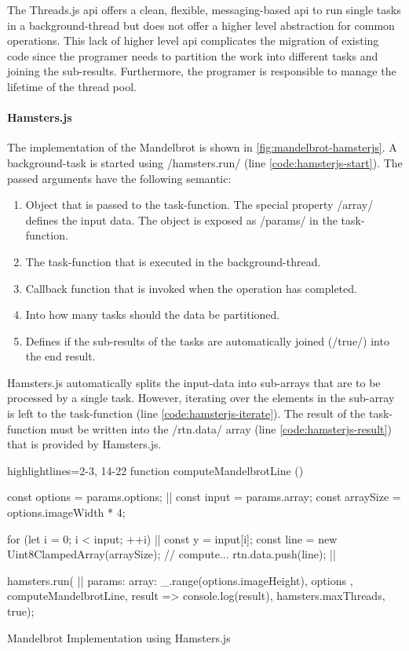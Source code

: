 The Threads.js api offers a clean, flexible, messaging-based api to run single tasks in a background-thread but does not offer a higher level abstraction for common operations. This lack of higher level api complicates the migration of existing code since the programer needs to partition the work into different tasks and joining the sub-results. Furthermore, the programer is responsible to manage the lifetime of the thread pool. 

\paragraph{Hamsters.js}
The implementation of the Mandelbrot is shown in \cref{fig:mandelbrot-hamsterjs}. A background-task is started using \javascriptinline/hamsters.run/ (line \ref{code:hamsterjs-start}). The passed arguments have the following semantic:

\begin{enumerate}
	\item Object that is passed to the task-function. The special property \javascriptinline/array/ defines the input data. The object is exposed as \javascriptinline/params/ in the task-function.
	\item The task-function that is executed in the background-thread.
	\item Callback function that is invoked when the operation has completed.
	\item Into how many tasks should the data be partitioned. 
	\item Defines if the sub-results of the tasks are automatically joined (\javascriptinline/true/) into the end result.
\end{enumerate}

Hamsters.js automatically splits the input-data into sub-arrays that are to be processed by a single task. However, iterating over the elements in the sub-array is left to the task-function (line \ref{code:hamsterjs-iterate}). The result of the task-function must be written into the \javascriptinline/rtn.data/ array (line \ref{code:hamsterjs-result}) that is provided by Hamsters.js. 

\begin{listing}
\begin{javascriptcode*}{highlightlines={2-3, 14-22}}
function computeMandelbrotLine () {
	const options = params.options; |$\label{code:hamstersjs-params}$|
	const input = params.array;
	const arraySize = options.imageWidth * 4;

	for (let i = 0; i < input; ++i) {|$\label{code:hamsterjs-iterate}$|
		const y = input[i];
		const line = new Uint8ClampedArray(arraySize);
		// compute...
		rtn.data.push(line); |$\label{code:hamsterjs-result}$|
	}
}

hamsters.run( |$\label{code:hamsterjs-start}$|
	params: {
		array: _.range(options.imageHeight),
		options
	},  
	computeMandelbrotLine, 
	result => console.log(result), 
	hamsters.maxThreads, 
	true);
\end{javascriptcode*}
\caption{Mandelbrot Implementation using Hamsters.js}
\label{fig:mandelbrot-hamsterjs}
\end{listing}


